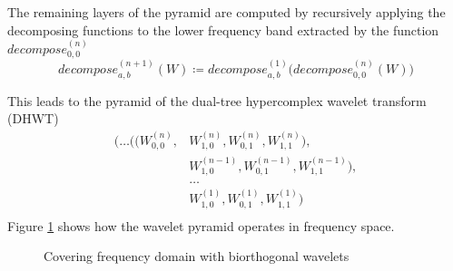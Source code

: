\documentclass[a4paper,12pt]{book}
\begin{document}
The remaining layers of the pyramid are computed by recursively
applying the decomposing functions to the lower frequency band extracted
by the function $decompose^{(n)}_{0,0}$
\begin{equation}
  decompose^{(n+1)}_{a,b}(W)\coloneqq
  decompose^{(1)}_{a,b}\big(decompose^{(n)}_{0,0}(W)\big)
\end{equation}

This leads to the pyramid of the dual-tree hypercomplex wavelet transform
(DHWT)
\begin{equation}
  \begin{split}
    \Big(\ldots\big((
    W^{(n)}_{0,0},&W^{(n)}_{1,0},W^{(n)}_{0,1},W^{(n)}_{1,1}),\\
    &W^{(n-1)}_{1,0},W^{(n-1)}_{0,1},W^{(n-1)}_{1,1}\big),\\
    &\ldots\\
    &W^{(1)}_{1,0},W^{(1)}_{0,1},W^{(1)}_{1,1}\Big)\\
  \end{split}
\end{equation}
Figure \ref{fig:selesnick} shows how the wavelet pyramid operates in
frequency space.
\begin{figure}[tbhp]
  \begin{center}
    \caption{Covering frequency domain with biorthogonal wavelets\label{fig:selesnick}}
  \end{center}
\end{figure}
\end{document}
